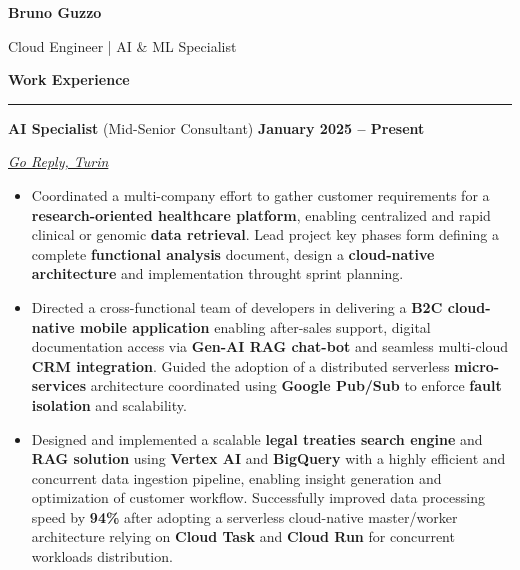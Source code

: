 \documentclass[9pt, a4paper]{article}
\newcommand{\cvsection}[1]{%
	\vspace{2pt}\par
	{\Large\bfseries\color{sectionblue}#1}\par
	\vspace{2pt}\hrule\vspace{6pt}
}
\newcommand{\jobsection}[3]{%
	\par {\large #1} \hfill {\bfseries #2} \par {\textit{#3}} \vspace{4pt}
}
\begin{document}
	
	\begin{center}
		{\Huge\bfseries Bruno Guzzo}\par
		\vspace{4pt}
		{\Large Cloud Engineer | AI \& ML Specialist}
	\end{center}
	
	\begin{minipage}[t]{0.65\linewidth}
		\vspace{0pt} %
		
		\cvsection{Work Experience}
		
		\jobsection{\textbf{AI Specialist} (Mid-Senior Consultant)}{January 2025 -- Present}{\href{https://www.reply.com/go-reply/en}{Go Reply, Turin}}
		
		\begin{itemize}[leftmargin=*, nosep]
			\item \footnotesize Coordinated a multi-company effort to gather customer requirements for a \textbf{research-oriented healthcare platform}, enabling centralized and rapid clinical or genomic \textbf{data retrieval}. Lead project key phases form defining a complete \textbf{functional analysis} document, design a \textbf{cloud-native architecture} and implementation throught sprint planning.      
			
			\vspace{5pt}
			\item \footnotesize Directed a cross-functional team of developers in delivering a \textbf{B2C cloud-native mobile application} enabling after-sales support, digital documentation access via \textbf{Gen-AI RAG chat-bot} and seamless multi-cloud \textbf{CRM integration}. Guided the adoption of a distributed serverless \textbf{micro-services} architecture coordinated using \textbf{Google Pub/Sub} to enforce \textbf{fault isolation} and scalability. 
			
			\vspace{5pt}
			\item \footnotesize Designed and implemented a scalable \textbf{legal treaties search engine} and \textbf{RAG solution} using \textbf{Vertex AI} and \textbf{BigQuery} with a highly efficient and concurrent data ingestion pipeline, enabling insight generation and optimization of customer workflow. 
			Successfully improved data processing speed by \textbf{94\%} after adopting a serverless cloud-native master/worker architecture relying on \textbf{Cloud Task} and \textbf{Cloud Run} for concurrent workloads distribution.      
			

\end{itemize}
\end{minipage}
\end{document}
